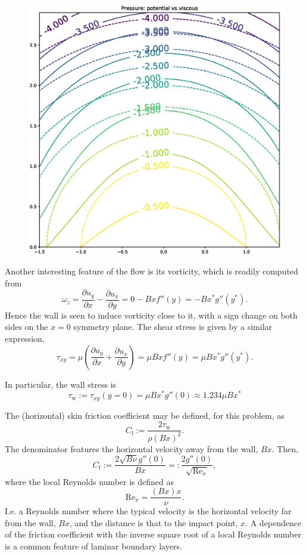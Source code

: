 \begin{figure}
  \centering
  \includegraphics[width=0.6\linewidth]{figures/stagnation_potential_viscous_pressures}
  \caption{\label{fig:stagnation_pressures}}
\end{figure}

Another interesting feature of the flow is its vorticity, which is
readily computed from
\[
\omega_z =
\frac{\partial u_y}{\partial x} -
\frac{\partial u_x}{\partial y} =
0 - B x f''(y)  = - B x^* g''(y^*) .
\]
Hence the wall is seen to induce vorticity close to it, with a sign change
on both sides on the $x=0$ symmetry plane. The shear stress is given by a
similar expression,
\[
\tau_{xy}= \mu
\left(
\frac{\partial u_y}{\partial x} +
\frac{\partial u_x}{\partial y}
\right)
 =  \mu B  x f''(y)  = \mu B x^* g''(y^*) .
 \]

 In particular, the wall stress is
 \[
 \tau_\mathrm{w}:=\tau_{xy}(y=0) = \mu B x^* g''(0)
 \approx 1.234 \mu B x^*
 \]

 The (horizontal) skin friction coefficient may be defined, for this problem,
 as
 \[
 C_\mathrm{f} := \frac{2 \tau_\mathrm{w} }{ \rho (B x)^2 } .
 \]
 The denominator features the horizontal velocity away from the wall,
 $B x$. Then,
 \[
 C_\mathrm{f} := \frac{2 \sqrt{B\nu}  g''(0) }{ B x } =:
 \frac{2   g''(0) }{\sqrt{ \mathrm{Re}_x} } ,
 \]
 where the local Reynolds number is defined as
 \[
 \mathrm{Re}_x = \frac{(Bx) x}{\nu} .
 \]
 I.e. a Reynolds number where the typical velocity is the horizontal
 velocity far from the wall, $Bx$, and the distance is that to the
 impact point, $x$. A dependence of the friction coefficient with the
 inverse square root of a local Reynolds number is a common feature of
 laminar boundary layers.
 
